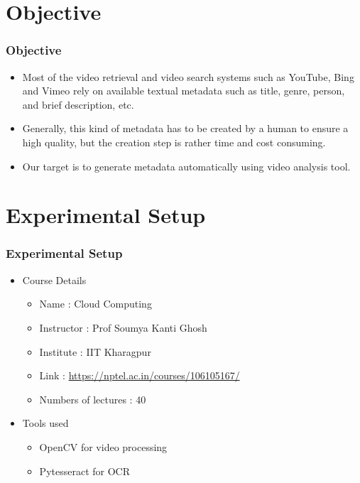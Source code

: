 \documentclass{beamer}
\begin{document}
\section{Objective} \label{Objective}

\begin{frame}
\frametitle{Objective}
\begin{itemize}
	
	\item Most of the video retrieval and video search systems such as YouTube, Bing and Vimeo rely on available textual metadata such as title, genre, person, and brief description, etc. 
	\item Generally, this kind of metadata has to be created by a human to ensure a high quality, but the creation step is rather time and cost consuming.
	\item Our target is to generate metadata automatically using video analysis tool.
	
\end{itemize}
\end{frame}


\section{Experimental Setup} \label{Experimental Setup}
\begin{frame}
\frametitle{Experimental Setup}
	\begin{itemize}
		\item Course Details
		\begin{itemize}
			\item Name : Cloud Computing
			\item Instructor : Prof Soumya Kanti Ghosh
			\item Institute : IIT Kharagpur
			\item Link : \url{https://nptel.ac.in/courses/106105167/}
			\item Numbers of lectures : 40
		\end{itemize}
		\item Tools used
		\begin{itemize} 
			\item OpenCV for video processing
			\item Pytesseract for OCR
		\end{itemize}
	\end{itemize}
\end{frame}
\end{document}
